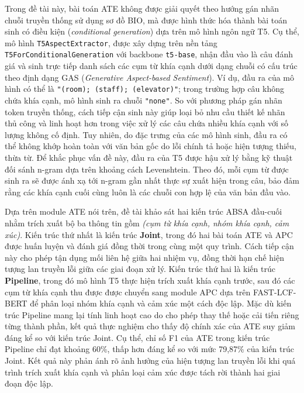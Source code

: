 Trong đề tài này, bài toán ATE không được giải quyết theo hướng gán nhãn chuỗi truyền thống sử dụng sơ đồ BIO, mà được hình thức hóa thành bài toán sinh có điều kiện (\textit{conditional generation}) dựa trên mô hình ngôn ngữ T5. Cụ thể, mô hình \texttt{T5AspectExtractor}, được xây dựng trên nền tảng \texttt{T5ForConditionalGeneration} với backbone \texttt{t5-base}, nhận đầu vào là câu đánh giá và sinh trực tiếp danh sách các cụm từ khía cạnh dưới dạng chuỗi có cấu trúc theo định dạng GAS (\textit{Generative Aspect-based Sentiment}). Ví dụ, đầu ra của mô hình có thể là \texttt{"(room); (staff); (elevator)"}; trong trường hợp câu không chứa khía cạnh, mô hình sinh ra chuỗi \texttt{"none"}. So với phương pháp gán nhãn token truyền thống, cách tiếp cận sinh này giúp loại bỏ nhu cầu thiết kế nhãn thủ công và linh hoạt hơn trong việc xử lý các câu chứa nhiều khía cạnh với số lượng không cố định. Tuy nhiên, do đặc trưng của các mô hình sinh, đầu ra có thể không khớp hoàn toàn với văn bản gốc do lỗi chính tả hoặc hiện tượng thiếu, thừa từ. Để khắc phục vấn đề này, đầu ra của T5 được hậu xử lý bằng kỹ thuật đối sánh n-gram dựa trên khoảng cách Levenshtein. Theo đó, mỗi cụm từ được sinh ra sẽ được ánh xạ tới n-gram gần nhất thực sự xuất hiện trong câu, bảo đảm rằng các khía cạnh cuối cùng luôn là các chuỗi con hợp lệ của văn bản đầu vào.

Dựa trên module ATE nói trên, đề tài khảo sát hai kiến trúc ABSA đầu-cuối nhằm trích xuất bộ ba thông tin gồm \textit{(cụm từ khía cạnh, nhóm khía cạnh, cảm xúc)}. Kiến trúc thứ nhất là kiến trúc \textbf{Joint}, trong đó hai bài toán ATE và APC được huấn luyện và đánh giá đồng thời trong cùng một quy trình. Cách tiếp cận này cho phép tận dụng mối liên hệ giữa hai nhiệm vụ, đồng thời hạn chế hiện tượng lan truyền lỗi giữa các giai đoạn xử lý. Kiến trúc thứ hai là kiến trúc \textbf{Pipeline}, trong đó mô hình T5 thực hiện trích xuất khía cạnh trước, sau đó các cụm từ khía cạnh thu được được chuyển sang module APC dựa trên FAST-LCF-BERT để phân loại nhóm khía cạnh và cảm xúc một cách độc lập. Mặc dù kiến trúc Pipeline mang lại tính linh hoạt cao do cho phép thay thế hoặc cải tiến riêng từng thành phần, kết quả thực nghiệm cho thấy độ chính xác của ATE suy giảm đáng kể so với kiến trúc Joint. Cụ thể, chỉ số F1 của ATE trong kiến trúc Pipeline chỉ đạt khoảng 60\%, thấp hơn đáng kể so với mức 79,87\% của kiến trúc Joint. Kết quả này phản ánh rõ ảnh hưởng của hiện tượng lan truyền lỗi khi quá trình trích xuất khía cạnh và phân loại cảm xúc được tách rời thành hai giai đoạn độc lập.

